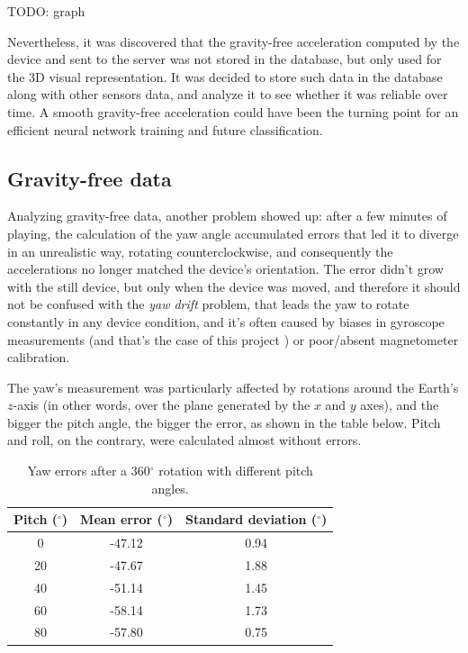 TODO: graph
\bigbreak

Nevertheless, it was discovered that the gravity-free acceleration computed by the device and sent to the server was not stored in the database, but only used for the 3D visual representation. It was decided to store such data in the database along with other sensors data, and analyze it to see whether it was reliable over time. A smooth gravity-free acceleration could have been the turning point for an efficient neural network training and future classification.
\bigbreak

\subsection{Gravity-free data}
Analyzing gravity-free data, another problem showed up: after a few minutes of playing, the calculation of the yaw angle accumulated errors that led it to diverge in an unrealistic way, rotating counterclockwise, and consequently the accelerations no longer matched the device's orientation. The error didn't grow with the still device, but only when the device was moved, and therefore it should not be confused with the \textit{yaw drift} problem, that leads the yaw to rotate constantly in any device condition, and it's often caused by biases in gyroscope measurements (and that's the case of this project \cite{Pio19}) or poor/absent magnetometer calibration.
\bigbreak

The yaw's measurement was particularly affected by rotations around the Earth's $z$-axis (in other words, over the plane generated by the $x$ and $y$ axes), and the bigger the pitch angle, the bigger the error, as shown in the table below. Pitch and roll, on the contrary, were calculated almost without errors.
\bigbreak

\begin{table}[ht!]
	\centering
	\begin{tabular}{c|c c}
	\textbf{Pitch} ($^{\circ}$) & \textbf{Mean error} ($^{\circ}$) & \textbf{Standard deviation} ($^{\circ}$) \\ \hline
	0                           & -47.12                           & 0.94                                     \\
	20                          & -47.67                           & 1.88                                     \\
	40                          & -51.14                           & 1.45                                     \\
	60                          & -58.14                           & 1.73                                     \\
	80                          & -57.80                           & 0.75
	\end{tabular}
	\caption{Yaw errors after a 360$^{\circ}$ rotation with different pitch angles.}
\end{table}

